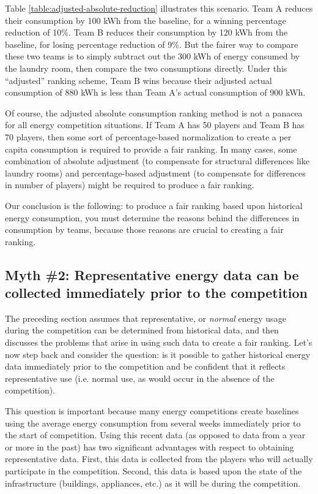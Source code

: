 \documentclass[jou]{apa} %
\begin{document}
Table \ref{table:adjusted-absolute-reduction} illustrates this scenario.  Team A reduces
their consumption by 100 kWh from the baseline, for a winning percentage reduction of 10\%. Team B
reduces their consumption by 120 kWh from the baseline, for losing percentage reduction of
9\%.  But the fairer way to compare these two teams is to simply subtract out the 300 kWh
of energy consumed by the laundry room, then compare the two consumptions directly.  Under
this ``adjusted'' ranking scheme, Team B wins because their adjusted actual consumption of 880
kWh is less than Team A's actual consumption of 900 kWh.

Of course, the adjusted absolute consumption ranking method is not a panacea for all
energy competition situations.  If Team A has 50 players and Team B has 70 players, then
some sort of percentage-based normalization to create a per capita consumption is
required to provide a fair ranking.  In many cases, some combination of absolute
adjustment (to compensate for structural differences like laundry rooms) and
percentage-based adjustment (to compensate for differences in number of players) might be
required to produce a fair ranking.

Our conclusion is the following: to produce a fair ranking based upon 
historical energy consumption, you must determine the reasons behind the differences in
consumption by teams, because those reasons are crucial to creating a fair ranking.

\subsection{Myth \#2: Representative energy data can be collected immediately prior to the competition}

The preceding section assumes that representative, or \emph{normal} energy usage during the
competition can be determined from historical data, and then discusses the problems that
arise in using such data to create a fair ranking.  Let's now step back and consider the
question: is it possible to gather historical energy data immediately prior to the
competition and be confident that it reflects representative use (i.e. normal use, as
would occur in the absence of the competition). 

This question is important because many energy competitions create baselines using the
average energy consumption from several weeks immediately prior to the start of
competition.  Using this recent data (as opposed to data from a year or more in the past)
has two significant advantages with respect to obtaining representative data. First, this
data is collected from the players who will actually participate in the competition.
Second, this data is based upon the state of the infrastructure (buildings, appliances,
etc.) as it will be during the competition.
\end{document}
